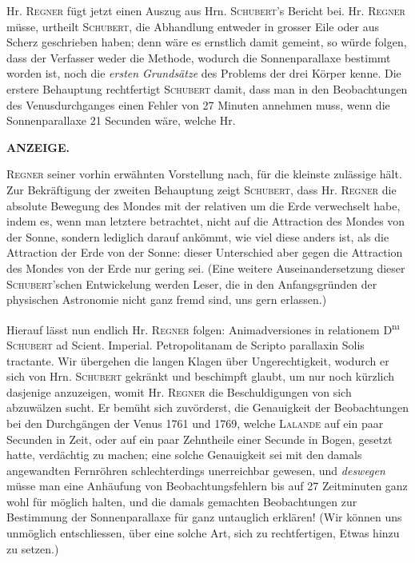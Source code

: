 Hr. \textsc{Regner} fügt jetzt einen Auszug aus Hrn. \textsc{Schubert}'s Bericht bei. Hr. \textsc{Regner} müsse, urtheilt \textsc{Schubert}, die Abhandlung entweder in grosser Eile oder aus Scherz geschrieben haben; denn wäre es ernstlich damit gemeint, so würde folgen, dass der Verfasser weder die Methode, wodurch die Sonnenparallaxe bestimmt worden ist, noch die \emph{ersten Grundsätze} des Problems der drei Körper kenne. Die erstere Behauptung rechtfertigt \textsc{Schubert} damit, dass man in den Beobachtungen des Venusdurchganges einen Fehler von 27 Minuten annehmen muss, wenn die Sonnenparallaxe 21 Secunden wäre, welche Hr.\par
\clearpage
\noindent{}%
%
\parbox[t]{\dimexpr\linewidth-24mm\relax}{\centering\footnotesize\bfseries ANZEIGE.\par}%
\makebox[12mm][r]{}\par\nobreak\medskip
\noindent \textsc{Regner} seiner vorhin erwähnten Vorstellung nach, für die kleinste zulässige hält. Zur Bekräftigung der zweiten Behauptung zeigt \textsc{Schubert}, dass Hr. \textsc{Regner} die absolute Bewegung des Mondes mit der relativen um die Erde verwechselt habe, indem es, wenn man letztere betrachtet, nicht auf die Attraction des Mondes von der Sonne, sondern lediglich darauf ankömmt, wie viel diese anders ist, als die Attraction der Erde von der Sonne: dieser Unterschied aber gegen die Attraction des Mondes von der Erde nur gering sei. (Eine weitere Auseinandersetzung dieser \textsc{Schubert}'schen Entwickelung werden Leser, die in den Anfangsgründen der physischen Astronomie nicht ganz fremd sind, uns gern erlassen.)

Hierauf lässt nun endlich Hr. \textsc{Regner} folgen: Animadversiones in relationem D\textsuperscript{nı} \textsc{Schubert} ad Scient. Imperial. Petropolitanam de Scripto parallaxin Solis tractante. Wir übergehen die langen Klagen über Ungerechtigkeit, wodurch er sich von Hrn. \textsc{Schubert} gekränkt und beschimpft glaubt, um nur noch kürzlich dasjenige anzuzeigen, womit Hr. \textsc{Regner} die Beschuldigungen von sich abzuwälzen sucht. Er bemüht sich zuvörderst, die Genauigkeit der Beobachtungen bei den Durchgängen der Venus 1761 und 1769, welche \textsc{Lalande} auf ein paar Secunden in Zeit, oder auf ein paar Zehntheile einer Secunde in Bogen, gesetzt hatte, verdächtig zu machen; eine solche Genauigkeit sei mit den damals angewandten Fernröhren schlechterdings unerreichbar gewesen, und \emph{deswegen} müsse man eine Anhäufung von Beobachtungsfehlern bis auf 27 Zeitminuten ganz wohl für möglich halten, und die damals gemachten Beobachtungen zur Bestimmung der Sonnenparallaxe für ganz untauglich erklären! (Wir können uns unmöglich entschliessen, über eine solche Art, sich zu rechtfertigen, Etwas hinzu zu setzen.)

